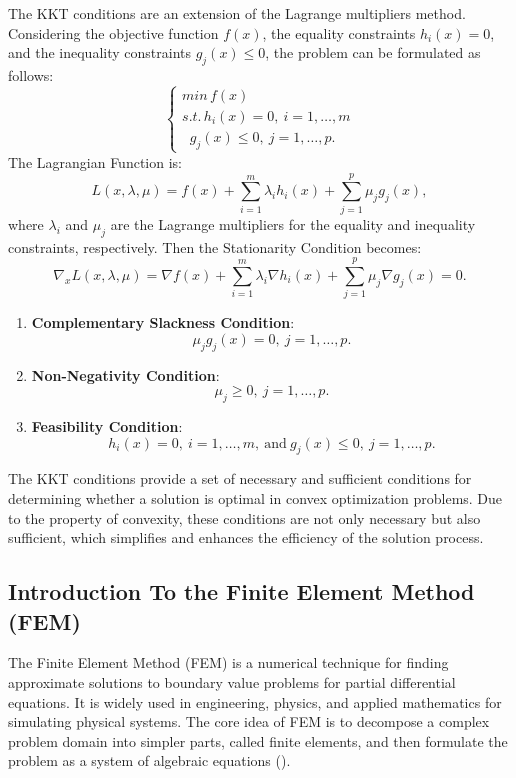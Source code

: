 \documentclass{article}
\begin{document}
The KKT conditions are an extension of the Lagrange multipliers method. Considering the objective function \(f(x)\), the equality constraints \(h_i(x) = 0\), and the inequality constraints \(g_j(x) \leq 0\), the problem can be formulated as follows:
\begin{equation}
    \begin{cases}
        min \, f(x)\\
        s.t. \,  h_i(x) = 0, \ i = 1, \ldots, m\\
        \,\, \ g_j(x) \leq 0, \ j = 1, \ldots, p.
    \end{cases}
\end{equation}
The Lagrangian Function is:
    \[
    L(x, \lambda, \mu) = f(x) + \sum_{i=1}^{m} \lambda_i h_i(x) + \sum_{j=1}^{p} \mu_j g_j(x),
    \]
    where \(\lambda_i\) and \(\mu_j\) are the Lagrange multipliers for the equality and inequality constraints, respectively.
Then the Stationarity Condition becomes:
    \[
    \nabla_x L(x, \lambda, \mu) = \nabla f(x) + \sum_{i=1}^{m} \lambda_i \nabla h_i(x) + \sum_{j=1}^{p} \mu_j \nabla g_j(x) = 0.
    \]
\begin{enumerate}
    \item \textbf{Complementary Slackness Condition}:
    \[
    \mu_j g_j(x) = 0, \ j = 1, \ldots, p.
    \]
    \item \textbf{Non-Negativity Condition}:
    \[
    \mu_j \geq 0, \ j = 1, \ldots, p.
    \]
    \item \textbf{Feasibility Condition}:
    \[
    h_i(x) = 0, \ i = 1, \ldots, m,\ \text{and} \ g_j(x) \leq 0, \ j = 1, \ldots, p.
    \]
\end{enumerate}

The KKT conditions provide a set of necessary and sufficient conditions for determining whether a solution is optimal in convex optimization problems. Due to the property of convexity, these conditions are not only necessary but also sufficient, which simplifies and enhances the efficiency of the solution process.


\subsection{Introduction To the Finite Element Method (FEM)}

The Finite Element Method (FEM) is a numerical technique for finding approximate solutions to boundary value problems for partial differential equations. It is widely used in engineering, physics, and applied mathematics for simulating physical systems. The core idea of FEM is to decompose a complex problem domain into simpler parts, called finite elements, and then formulate the problem as a system of algebraic equations (\textcite{FEM}).
\end{document}
